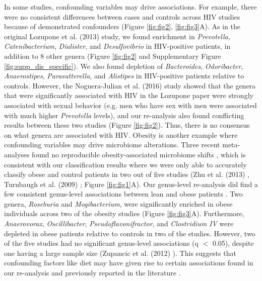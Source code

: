 In some studies, confounding variables may drive associations.
For example, there were no consistent differences between cases and controls across HIV studies because of demonstrated confounders \cite{noguera2016gut,lozupone2013alterations,hiv-dinh} (Figure \ref{fig:fig2}, \ref{fig:fig3}A).
As in the original Lozupone et al. (2013) \cite{lozupone2013alterations} study, we found enrichment in \textit{Prevotella}, \textit{Catenibacterium}, \textit{Dialister}, and \textit{Desulfovibrio} in HIV-positive patients, in addition to 8 other genera (Figure \ref{fig:fig2} and Supplementary Figure \ref{fig:supp_dis_specific}).
We also found depletion of \textit{Bacteroides}, \textit{Odoribacter}, \textit{Anaerostipes}, \textit{Parasutterella}, and \textit{Alistipes} in HIV-positive patients relative to controls.
However, the Noguera-Julian et al. (2016) study showed that the genera that were significantly associated with HIV in the Lozupone paper were strongly associated with sexual behavior (e.g. men who have sex with men were associated with much higher \textit{Prevotella} levels), and our re-analysis also found conflicting results between these two studies (Figure \ref{fig:fig2}).
Thus, there is no consensus on what genera are associated with HIV.
Obesity is another example where confounding variables may drive microbiome alterations.
Three recent meta-analyses found no reproducible obesity-associated microbiome shifts \cite{walters2014meta,Sze07092016,finucane2014obesity}, which is consistent with our classification results where we were only able to accurately classify obese and control patients in two out of five studies (Zhu et al. (2013) \cite{nash-baker}, Turnbaugh et al. (2009) \cite{ob-gordon}; Figure \ref{fig:fig1}A).
Our genus-level re-analysis did find a few consistent genus-level associations between lean and obese patients \cite{nash-baker,ob-gordon,ob-goodrich,ob-zupancic,ob-ross}.
Two genera, \textit{Roseburia} and \textit{Mogibacterium}, were significantly enriched in obese individuals across two of the obesity studies (Figure \ref{fig:fig3}A).
Furthermore, \textit{Anaerovorax}, \textit{Oscillibacter}, \textit{Pseudoflavonifractor}, and \textit{Clostridium IV}  were depleted in obese patients relative to controls in two of the studies.
However, two of the five studies had no significant genus-level associations (q $<$ 0.05), despite one having a large sample size (Zupancic et al. (2012) \cite{ob-zupancic}).
This suggests that confounding factors like diet may have given rise to certain associations found in our re-analysis and previously reported in the literature \cite{finucane2014obesity}.
